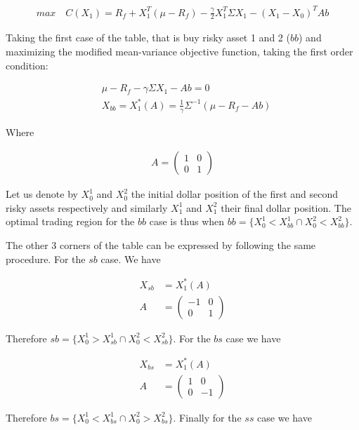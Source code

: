 \documentclass[10pt]{article}
\begin{document}
\begin{align*}
	max \quad C(X_1) = R_f  + X_1^T(\mu - R_f)  - \frac{\gamma}{2} X_1^T \Sigma X_1  - (X_1  - X_0)^TAb
\end{align*}

Taking the first case of the table, that is buy risky asset 1 and 2 ($bb$) and maximizing the modified mean-variance objective function, taking the first order condition: 

\begin{align*}
	& \mu - R_f - \gamma \Sigma X_1 - Ab = 0\\
	& X_{bb} = X_1^*(A) = \frac{1}{\gamma}\Sigma^{-1} (\mu - R_f - Ab)
\end{align*}

Where 

\begin{align*}
	A = \begin{pmatrix}
	1 & 0\\	
	0 & 1
\end{pmatrix}
\end{align*}

Let us denote by $X_0^1$ and $X_0^2$ the initial dollar position of the first and second risky assets respectively and similarly $X_1^1$ and $X_1^2$ their final dollar position. The optimal trading region for the $bb$ case is thus when $bb = \{X_0^1 < X_{bb}^1 \cap  X_0^2 < X_{bb}^2\}$.

\bigbreak

The other 3 corners of the table can be expressed by following the same procedure. For the $sb$ case. We have 

\begin{align*}
	X_{sb} &= X_1^*(A) \\
	A &=  \begin{pmatrix}
	-1 & 0\\	
	0 & 1
\end{pmatrix}
\end{align*}

Therefore $sb = \{X_0^1 > X_{sb}^1 \cap  X_0^2 < X_{sb}^2\}$. For the $bs$ case we have 

\begin{align*}
		X_{bs} &= X_1^*(A) \\
	A &=  \begin{pmatrix}
	1 & 0\\	
	0 & -1
\end{pmatrix}
\end{align*}

Therefore $bs = \{X_0^1 < X_{bs}^1 \cap  X_0^2 > X_{bs}^2\}$. Finally for the $ss$ case we have 
\end{document}
